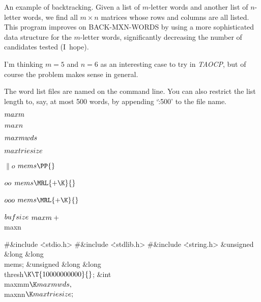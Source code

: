
\srcloctrue

An example of backtracking. Given a list of
$m$-letter words and another
list of $n$-letter words, we find all $m\times n$ matrices whose rows and
columns are all listed. This program improves on {\mc BACK-MXN-WORDS}
by using a more sophisticated data structure for the $m$-letter words,
significantly decreasing the number of candidates tested (I~hope).

I'm thinking $m=5$ and $n=6$ as an interesting case to try in {\sl TAOCP},
but of course the problem makes sense in general.

The word list files are named on the command line. You can also restrict
the list length to, say, at most 500 words, by appending `\.{:500}' to
the file name.

\Y\B\4\D$\\{maxm}$ \5
\par
\B\4\D$\\{maxn}$ \5
\par
\B\4\D$\\{maxmwds}$ \5
\par
\B\4\D$\\{maxtriesize}$ \5
\par
\B\4\D$\|o$ \5
$\\{mems}\PP{}$\par
\B\4\D$\\{oo}$ \5
$\\{mems}\MRL{+{\K}}{}$\par
\B\4\D$\\{ooo}$ \5
$\\{mems}\MRL{+{\K}}{}$\par
\B\4\D$\\{bufsize}$ \5
$\\{maxm}+{}$\\{maxn}\par
\Y\B\8\#\&{include} \.{<stdio.h>}\6
\8\#\&{include} \.{<stdlib.h>}\6
\8\#\&{include} \.{<string.h>}\6
\&{unsigned} \&{long} \&{long} \\{mems};\6
\&{unsigned} \&{long} \&{long} \\{thresh}${}\K\T{10000000000}{}$;\6
\&{int} \\{maxmm}${}\K\\{maxmwds},{}$ \\{maxnn}${}\K\\{maxtriesize};{}$\6
